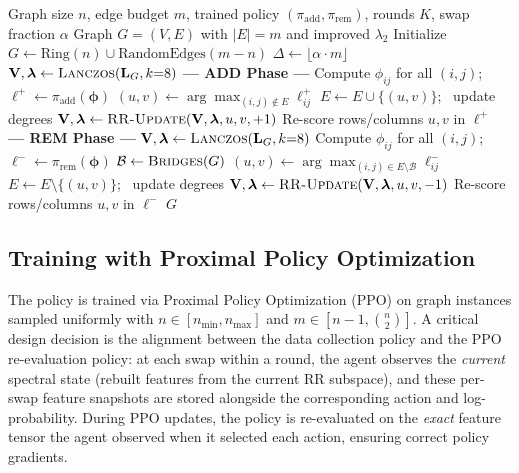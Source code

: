 \documentclass{article}
\begin{document}
\begin{algorithm}[t]
\caption{REFINE Inference}\label{alg:refine_inference}
\begin{algorithmic}[1]
\Require Graph size $n$, edge budget $m$, trained policy $(\pi_{\text{add}}, \pi_{\text{rem}})$, rounds $K$, swap fraction $\alpha$
\Ensure Graph $G = (V, E)$ with $|E| = m$ and improved $\lambda_2$
\State Initialize $G \gets \text{Ring}(n) \cup \text{RandomEdges}(m - n)$
\State $\Delta \gets \lfloor \alpha \cdot m \rfloor$
    \State $\mathbf{V}, \boldsymbol{\lambda} \gets \textsc{Lanczos}(\mathbf{L}_G, k{=}8)$ 
    \Statex \hspace{\algorithmicindent}\textbf{--- ADD Phase ---}
    \State Compute $\phi_{ij}$ for all $(i,j)$; \, $\boldsymbol{\ell}^+ \gets \pi_{\text{add}}(\boldsymbol{\phi})$ 
        \State $(u, v) \gets \arg\max_{(i,j) \notin E} \ell_{ij}^+$
        \State $E \gets E \cup \{(u,v)\}$; \, update degrees
        \State $\mathbf{V}, \boldsymbol{\lambda} \gets \textsc{RR-Update}(\mathbf{V}, \boldsymbol{\lambda}, u, v, {+}1)$ 
        \State Re-score rows/columns $u, v$ in $\boldsymbol{\ell}^+$ 
    \EndFor
    \Statex \hspace{\algorithmicindent}\textbf{--- REM Phase ---}
    \State $\mathbf{V}, \boldsymbol{\lambda} \gets \textsc{Lanczos}(\mathbf{L}_G, k{=}8)$ 
    \State Compute $\phi_{ij}$ for all $(i,j)$; \, $\boldsymbol{\ell}^- \gets \pi_{\text{rem}}(\boldsymbol{\phi})$ 
        \State $\mathcal{B} \gets \textsc{Bridges}(G)$ 
        \State $(u, v) \gets \arg\max_{(i,j) \in E \setminus \mathcal{B}} \ell_{ij}^-$
        \State $E \gets E \setminus \{(u,v)\}$; \, update degrees
        \State $\mathbf{V}, \boldsymbol{\lambda} \gets \textsc{RR-Update}(\mathbf{V}, \boldsymbol{\lambda}, u, v, {-}1)$ 
        \State Re-score rows/columns $u, v$ in $\boldsymbol{\ell}^-$ 
    \EndFor
\EndFor
\State \Return $G$
\end{algorithmic}
\end{algorithm}

\subsection{Training with Proximal Policy Optimization}

The policy is trained via Proximal Policy Optimization (PPO) \cite{schulman2017proximal} on graph instances sampled uniformly with $n \in [n_{\min}, n_{\max}]$ and $m \in [n-1, \binom{n}{2}]$. A critical design decision is the alignment between the data collection policy and the PPO re-evaluation policy: at each swap within a round, the agent observes the \emph{current} spectral state (rebuilt features from the current RR subspace), and these per-swap feature snapshots are stored alongside the corresponding action and log-probability. During PPO updates, the policy is re-evaluated on the \emph{exact} feature tensor the agent observed when it selected each action, ensuring correct policy gradients.
\end{document}
